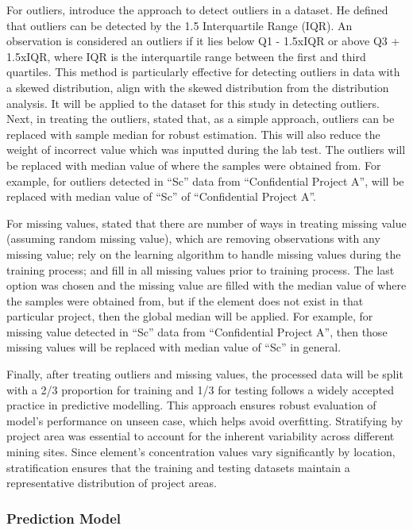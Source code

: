 \documentclass[11pt,a4paper,]{article}
\begin{document}
For outliers, \textcite{tukey1977} introduce the approach to detect outliers in a dataset. He defined that outliers can be detected by the 1.5 Interquartile Range (IQR). An observation is considered an outliers if it lies below Q1 - 1.5xIQR or above Q3 + 1.5xIQR, where IQR is the interquartile range between the first and third quartiles. This method is particularly effective for detecting outliers in data with a skewed distribution, align with the skewed distribution from the distribution analysis. It will be applied to the dataset for this study in detecting outliers. Next, in treating the outliers, \autocite{Barnett1995} stated that, as a simple approach, outliers can be replaced with sample median for robust estimation. This will also reduce the weight of incorrect value which was inputted during the lab test. The outliers will be replaced with median value of where the samples were obtained from. For example, for outliers detected in ``Sc'' data from ``Confidential Project A'', will be replaced with median value of ``Sc'' of ``Confidential Project A''.

For missing values, \textcite{Hastie09} stated that there are number of ways in treating missing value (assuming random missing value), which are removing observations with any missing value; rely on the learning algorithm to handle missing values during the training process; and fill in all missing values prior to training process. The last option was chosen and the missing value are filled with the median value of where the samples were obtained from, but if the element does not exist in that particular project, then the global median will be applied. For example, for missing value detected in ``Sc'' data from ``Confidential Project A'', then those missing values will be replaced with median value of ``Sc'' in general.

Finally, after treating outliers and missing values, the processed data will be split with a 2/3 proportion for training and 1/3 for testing follows a widely accepted practice in predictive modelling. This approach ensures robust evaluation of model's performance on unseen case, which helps avoid overfitting. Stratifying by project area was essential to account for the inherent variability across different mining sites. Since element's concentration values vary significantly by location, stratification ensures that the training and testing datasets maintain a representative distribution of project areas.

\subsubsection{Prediction Model}\label{prediction-model}
\end{document}
